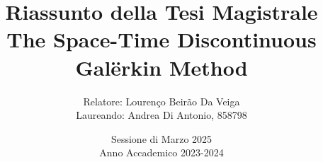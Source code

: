 
\newcommand{\documenttitle}{The Space-Time Discontinuous Galërkin Method}
\newcommand{\brokendocumenttitle}{The Space-Time \\ Discontinuous Galërkin Method}

\newcommand{\documentauthor}{Andrea Di Antonio}
\newcommand{\documentdate}{Sessione di Marzo 2025 \\ Anno Accademico 2023-2024}

\author{Relatore: Lourenço Beirão Da Veiga \\ Laureando: \documentauthor, 858798}
\title{Riassunto della Tesi Magistrale \\ \documenttitle}
\date{\documentdate}